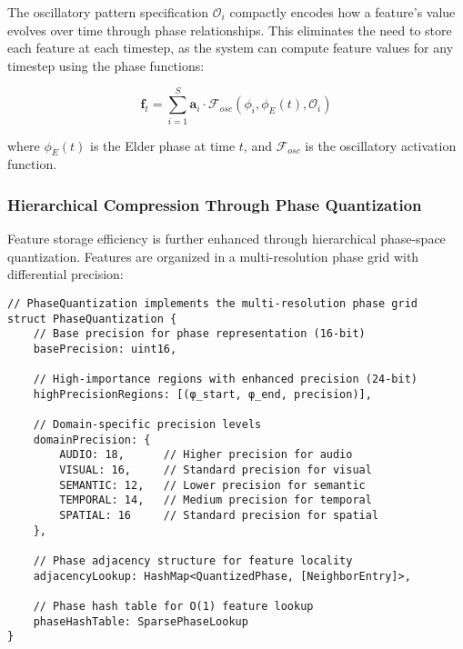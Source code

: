 The oscillatory pattern specification $\mathcal{O}_i$ compactly encodes how a feature's value evolves over time through phase relationships. This eliminates the need to store each feature at each timestep, as the system can compute feature values for any timestep using the phase functions:

\begin{equation}
\mathbf{f}_t = \sum_{i=1}^{S} \mathbf{a}_i \cdot \mathcal{F}_{osc}(\phi_i, \phi_E(t), \mathcal{O}_i)
\end{equation}

where $\phi_E(t)$ is the Elder phase at time $t$, and $\mathcal{F}_{osc}$ is the oscillatory activation function.

\subsubsection{Hierarchical Compression Through Phase Quantization}

Feature storage efficiency is further enhanced through hierarchical phase-space quantization. Features are organized in a multi-resolution phase grid with differential precision:

\begin{tcolorbox}[colback=CodeBackground, colframe=DarkGray, title=Hierarchical Phase Quantization, fonttitle=\bfseries]
\begin{verbatim}
// PhaseQuantization implements the multi-resolution phase grid
struct PhaseQuantization {
    // Base precision for phase representation (16-bit)
    basePrecision: uint16,
    
    // High-importance regions with enhanced precision (24-bit)
    highPrecisionRegions: [(φ_start, φ_end, precision)],
    
    // Domain-specific precision levels
    domainPrecision: {
        AUDIO: 18,      // Higher precision for audio
        VISUAL: 16,     // Standard precision for visual 
        SEMANTIC: 12,   // Lower precision for semantic
        TEMPORAL: 14,   // Medium precision for temporal
        SPATIAL: 16     // Standard precision for spatial
    },
    
    // Phase adjacency structure for feature locality
    adjacencyLookup: HashMap<QuantizedPhase, [NeighborEntry]>,
    
    // Phase hash table for O(1) feature lookup
    phaseHashTable: SparsePhaseLookup
}
\end{verbatim}
\end{tcolorbox}

